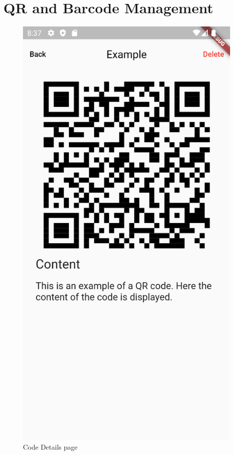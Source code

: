 \documentclass[a4paper,12pt]{report}
\begin{document}
\section{QR and Barcode Management}

\begin{figure}[H]
    \centering
    \includegraphics[scale=0.45]{images/app/view_qr.png}
    \caption{Code Details page}\label{fig:code_details}
\end{figure}
\end{document}
